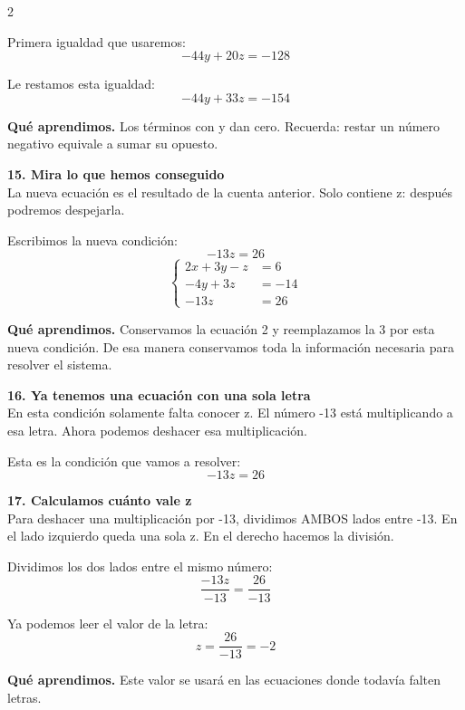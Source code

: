 \documentclass[11pt,a4paper,landscape]{article}
\begin{document}
\begin{multicols*}{2}
\begin{minipage}{\linewidth}
\par\smallskip Primera igualdad que usaremos:
\[-44y + 20z = -128\]
\par\smallskip Le restamos esta igualdad:
\[-44y + 33z = -154\]
\par\smallskip\textbf{Qué aprendimos.} Los términos con y dan cero. Recuerda: restar un número negativo equivale a sumar su opuesto.
\end{minipage}\par\medskip
\noindent\begin{minipage}{\linewidth}\textbf{15. Mira lo que hemos conseguido}\\[2pt]La nueva ecuación es el resultado de la cuenta anterior. Solo contiene z: después podremos despejarla.
\par\smallskip Escribimos la nueva condición:
\[-13z = 26\]
\[\left\{\begin{aligned}2x + 3y - z &= 6\\-4y + 3z &= -14\\-13z &= 26\end{aligned}\right.\]
\par\smallskip\textbf{Qué aprendimos.} Conservamos la ecuación 2 y reemplazamos la 3 por esta nueva condición. De esa manera conservamos toda la información necesaria para resolver el sistema.
\end{minipage}\par\medskip
\noindent\begin{minipage}{\linewidth}\textbf{16. Ya tenemos una ecuación con una sola letra}\\[2pt]En esta condición solamente falta conocer z. El número -13 está multiplicando a esa letra. Ahora podemos deshacer esa multiplicación.
\par\smallskip Esta es la condición que vamos a resolver:
\[-13z = 26\]
\end{minipage}\par\medskip
\noindent\begin{minipage}{\linewidth}\textbf{17. Calculamos cuánto vale z}\\[2pt]Para deshacer una multiplicación por -13, dividimos AMBOS lados entre -13. En el lado izquierdo queda una sola z. En el derecho hacemos la división.
\par\smallskip Dividimos los dos lados entre el mismo número:
\[\frac{-13z}{-13}=\frac{26}{-13}\]
\par\smallskip Ya podemos leer el valor de la letra:
\[z=\frac{26}{-13}=-2\]
\par\smallskip\textbf{Qué aprendimos.} Este valor se usará en las ecuaciones donde todavía falten letras.

\end{minipage}
\end{multicols*}
\end{document}
